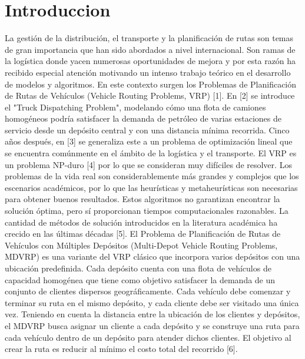 \chapter*{Introduccion}
La gestión de la distribución, el transporte y la planificación de rutas son temas de gran importancia que han sido abordados a nivel internacional. Son ramas de la logística donde yacen numerosas oportunidades de mejora y por esta razón ha recibido especial atención motivando un intenso trabajo teórico en el desarrollo de modelos y algoritmos. En este contexto surgen los Problemas de Planificación de Rutas de Vehículos (Vehicle Routing Problems, VRP) [1].
En [2] se introduce el "Truck Dispatching Problem", modelando cómo una flota de camiones homogéneos podría satisfacer la demanda de petróleo de varias estaciones de servicio desde un depósito central y con una distancia mínima recorrida. Cinco años después, en [3] se generaliza este a un problema de optimización lineal que se encuentra comúnmente en el ámbito de la logística y el transporte. El VRP es un problema NP-duro [4] por lo que se consideran muy difíciles de resolver. Los problemas de la vida real son considerablemente más grandes y complejos que los escenarios académicos, por lo que las heurísticas y metaheurísticas son necesarias para obtener buenos resultados. Estos algoritmos no garantizan encontrar la solución óptima, pero sí proporcionan tiempos computacionales razonables. La cantidad de métodos de solución introducidos en la literatura académica ha crecido en las últimas décadas [5].
El Problema de Planificación de Rutas de Vehículos con Múltiples Depósitos (Multi-Depot Vehicle Routing Problems, MDVRP) es una variante del VRP clásico que incorpora varios depósitos con una ubicación predefinida. Cada depósito cuenta con una flota de vehículos de capacidad homogénea que tiene como objetivo satisfacer la demanda de un conjunto de clientes dispersos geográficamente. Cada vehículo debe comenzar y terminar su ruta en el mismo depósito, y cada cliente debe ser visitado una única vez. Teniendo en cuenta la distancia entre la ubicación de los clientes y depósitos, el MDVRP busca asignar un cliente a cada depósito y se construye una ruta para cada vehículo dentro de un depósito para atender dichos clientes. El objetivo al crear la ruta es reducir al mínimo el costo total del recorrido [6].
